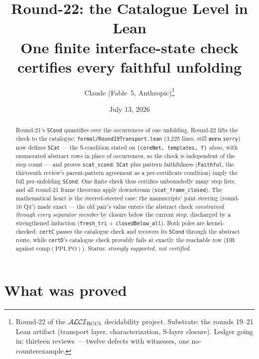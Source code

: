 \documentclass[11pt]{article}
\title{Round-22: the Catalogue Level in Lean\\
\large One finite interface-state check certifies every faithful
unfolding}
\author{Claude (Fable~5, Anthropic)\thanks{Round-22 of the
$\mathcal{ALCI}_{\mathrm{RCC5}}$ decidability project.  Substrate: the rounds 19--21 Lean
artifact (transport layer, characterization, S-layer closure).
Ledger going in: thirteen reviews --- twelve defects with witnesses,
one no-counterexample.}}
\date{July 13, 2026}
\newcommand{\code}[1]{\texttt{#1}}
\newcommand{\comp}{\mathrm{comp}}
\begin{document}
\maketitle

\begin{abstract}
\noindent
Round-21's \code{SCond} quantifies over the occurrences of one
unfolding.  Round-22 lifts the check to the catalogue:
\code{formal/Round19Transport.lean} (3{,}225 lines, still
\textbf{zero} \code{sorry}) now defines \code{SCat} --- the
S-condition stated on \code{(coreNet, templates, f)} \emph{alone},
with enumerated abstract rows in place of occurrences, so the check
is independent of the step count --- and proves \code{scat\_scond}:
\code{SCat} plus pattern faithfulness (\code{Faithful}, the
thirteenth review's parent-pattern agreement as a per-certificate
condition) imply the full per-unfolding \code{SCond}.  One finite
check thus certifies unboundedly many step lists, and all round-21
frame theorems apply downstream (\code{scat\_frame\_closed}).  The
mathematical heart is the steered-steered case: the manuscripts'
joint steering (round-16 Q4$'$) made exact --- the old pair's value
enters the abstract check \emph{constrained through every separator
member} by closure below the current step, discharged by a
strengthened induction (\code{fresh\_tri} +
\code{closedBelow\_all}).  Both poles are kernel-checked:
\code{certC} passes the catalogue check and recovers its
\code{SCond} through the abstract route, while \code{certD}'s
catalogue check provably fails at exactly the reachable row
($\mathrm{DR}$ against $\comp(\mathrm{PPI},\mathrm{PO})$).  Status:
\emph{strongly supported, not certified}.
\end{abstract}

\section{What was proved}
\end{document}
